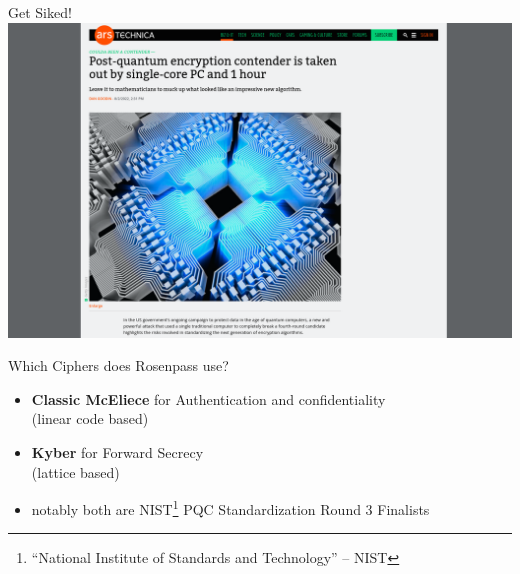 \documentclass{rosenpass-beamer}
\let\say\enquote
\begin{document}

\begin{frame}{Get Siked!}
  \includegraphics[height=.9\textheight]{assets/ars-headline.png}
\end{frame}


\begin{frame}{Which Ciphers does Rosenpass use?}
  \begin{itemize}
    \item \textbf{Classic McEliece} for Authentication and confidentiality\\
	    (linear code based)
    \item \textbf{Kyber} for Forward Secrecy\\
      (lattice based)
    \item notably both are NIST\footnote{\say{National Institute of Standards and Technology} -- NIST} PQC Standardization Round 3 Finalists
  \end{itemize}
\end{frame}

\end{document}
